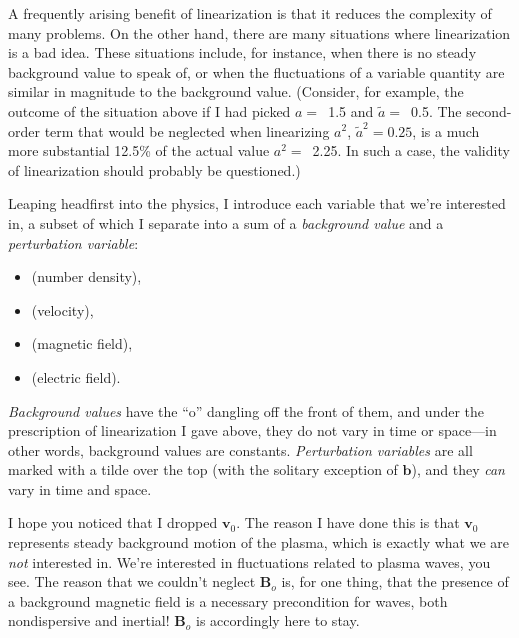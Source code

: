 A frequently arising benefit of linearization is that it reduces the complexity
of many problems. On the other hand, there are many situations where
linearization is a bad idea. These situations include, for instance, when there
is no steady background value to speak of, or when the fluctuations of a
variable quantity are similar in magnitude to the background value. (Consider,
for example, the outcome of the situation above if I had picked $a =$~1.5 and
$\tilde a =$~0.5. The second-order term that would be neglected when linearizing
$a^2$, $\tilde a^2 = 0.25$, is a much more substantial 12.5\% of the actual
value $a^2 =$~2.25. In such a case, the validity of linearization should
probably be questioned.)

Leaping headfirst into the physics, I introduce each variable that we're
interested in, a subset of which I separate into a sum of a \emph{background
  value} and a \emph{perturbation variable}: \par
\begin{itemize}
\item {} (number density),
\item {} (velocity),
\item {} (magnetic field),
\item {} (electric field).
\end{itemize}
\emph{Background values} have the ``o'' dangling off the front of them, and
under the prescription of linearization I gave above, they do not vary in time
or space---in other words, background values are constants. \emph{Perturbation
  variables} are all marked with a tilde over the top (with the solitary
exception of $\mathbf{b}$), and they \emph{can} vary in time and space.

I hope you noticed that I dropped $\mathbf{v}_0$. The reason I have done this is
that $\mathbf{v}_0$ represents steady background motion of the plasma, which is
exactly what we are \emph{not} interested in. We're interested in fluctuations
related to plasma waves, you see. The reason that we couldn't neglect
$\mathbf{B}_o$ is, for one thing, that the presence of a background magnetic
field is a necessary precondition for \Alf waves, both nondispersive and
inertial! $\mathbf{B}_o$ is accordingly here to stay.

